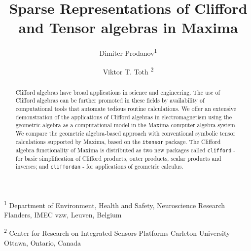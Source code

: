\documentclass[twoside,reqno,11pt]{amsart}
\theoremstyle{definition}
\theoremstyle{remark}
\numberwithin{equation}{section}
\newcommand{\symb}[1]{{\tt #1}}
\begin{document}
\title[Clifford and Tensor Algebras in Maxima]{Sparse Representations of Clifford and Tensor algebras in Maxima}

\author{Dimiter Prodanov\textsuperscript{1}}

\address{
	Department of Environment, Health and Safety,
	Neuroscience Research Flanders,
	IMEC vzw, Leuven, Belgium
}

\author{Viktor T. Toth \textsuperscript{2}}
\address{Center for Research on Integrated Sensors Platforms
	Carleton University
    Ottawa, Ontario, Canada
}



\newcommand{\Addresses}{{\bigskip
		\footnotesize
		
	 \textsuperscript{1} Department of Environment, Health and Safety,
	 Neuroscience Research Flanders,
	 IMEC vzw, Leuven, Belgium
		
	\medskip
		
	\textsuperscript{2} Center for Research on Integrated Sensors Platforms
	Carleton University
	Ottawa, Ontario, Canada		
	}}
	
\begin{abstract}
Clifford algebras have broad applications in science and engineering. The use of Clifford algebras can be further promoted in these fields by availability of computational tools that automate tedious routine calculations.
We offer an extensive demonstration of the applications of Clifford algebras in electromagnetism using the geometric algebra  as a computational model in the Maxima computer algebra  system.
We compare the geometric algebra-based approach with conventional symbolic tensor calculations supported by Maxima, based on the \symb{itensor} package.
The Clifford algebra functionality of Maxima is distributed as two new packages  called  \symb{clifford} - for basic  simplification of Clifford products, outer products, scalar products and inverses; and \symb{cliffordan} - for applications of geometric calculus.
\end{abstract}

\maketitle

\Addresses
\end{document}
